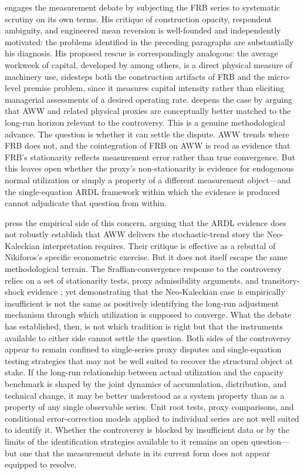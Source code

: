 \documentclass[11pt,a4paper]{article}
\begin{document}
\citet{Nikiforos2016} engages the measurement debate by subjecting the FRB series to systematic scrutiny
on its own terms. His critique of construction opacity, respondent ambiguity, and engineered mean reversion is well-founded and independently motivated: the problems identified in the preceding paragraphs are substantially his diagnosis. His proposed rescue is correspondingly analogous: the average workweek of capital, developed by
\citet{Foss1981,Foss1985} among others, is a direct physical measure of machinery use, sidesteps both the construction artifacts of FRB and the micro-level premise problem, since it measures capital intensity rather than eliciting managerial assessments of a desired operating rate. \citet{Nikiforos2021} deepens the case by arguing that AWW and related physical proxies are conceptually better matched to the long-run horizon relevant to the controversy. This is a genuine methodological advance. The question is whether it can settle the dispute. AWW trends where FRB does not, and the cointegration of FRB on AWW is read as evidence that FRB's stationarity reflects measurement error rather than
true convergence. But this leaves open whether the proxy's non-stationarity is evidence for endogenous normal utilization or simply a property of a different measurement object---and the single-equation ARDL framework within which the evidence is produced cannot adjudicate that question from within.

\citet{GahnGonzalez2020} press the empirical side of this concern, arguing that the ARDL evidence does not robustly establish that AWW delivers the stochastic-trend story the Neo-Kaleckian interpretation requires.
Their critique is effective as a rebuttal of Nikiforos's specific econometric exercise. But it does not itself escape the same methodological terrain. The Sraffian-convergence response to the controversy relies on a set of stationarity tests, proxy admissibility arguments, and transitory-shock evidence \citep{GahnGonzalez2022,Deleidi2024}; yet demonstrating that the Neo-Kaleckian case is empirically insufficient is not the same as positively identifying the long-run adjustment mechanism through which utilization is supposed to converge. What the debate has established, then, is not which tradition is right but that the instruments available to either side cannot settle the
question. Both sides of the controversy appear to remain confined to single-series proxy disputes and single-equation testing strategies that may not be well suited to recover the structural object at stake. If the long-run relationship between actual utilization and the capacity benchmark is shaped by the joint dynamics of accumulation, distribution, and technical change, it may be better understood as a system property than as a property of any single observable series. Unit root tests, proxy comparisons, and conditional error-correction models applied to individual series are not well suited to identify it. Whether the controversy is blocked by insufficient data or by the limits of the identification strategies available to it remains an open question---but one that the measurement debate in its current form does not appear equipped to resolve.
\end{document}
